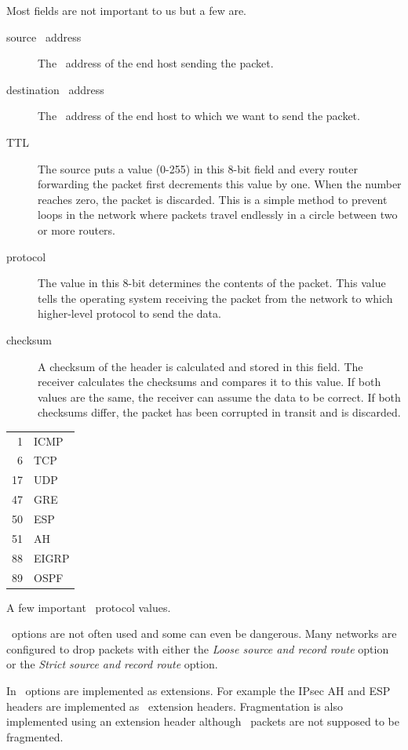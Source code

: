 Most fields are not important to us but a few are.
\begin{description}
\item[source \IP\ address]
   The \IP\ address of the end host sending the packet.
\item[destination \IP\ address]
   The \IP\ address of the end host to which we want to send the packet.
\item[\acf{TTL}]
   The source puts a value (0-255) in this 8-bit field and every router forwarding the packet first decrements this value by one.
   When the number reaches zero, the packet is discarded.
   This is a simple method to prevent loops in the network where packets travel endlessly in a circle between two or more routers.
\item[protocol]
   The value in this 8-bit determines the contents of the packet.
   This value tells the operating system receiving the packet from the network to which higher-level protocol to send the data.
\item[checksum]
   A checksum of the header is calculated and stored in this field.
   The receiver calculates the checksums and compares it to this value.
   If both values are the same, the receiver can assume the data to be correct.
   If both checksums differ, the packet has been corrupted in transit and is discarded.
\end{description}

\begin{margintable}
\begin{tabular}{rl}
 1 & \acs{ICMP}  \\
 6 & \acs{TCP}   \\
17 & \acs{UDP}   \\
47 & \acs{GRE}   \\
50 & \acs{ESP}   \\
51 & \acs{AH}    \\
88 & \acs{EIGRP} \\
89 & \acs{OSPF}  \\
\end{tabular}
\caption{A few important \IP\ protocol values.}
\end{margintable}

\IPfour\ options are not often used and some can even be dangerous.
Many networks are configured to drop packets with either the \emph{Loose source and record route} option or the \emph{Strict source and record route} option.

In \IPsix\ options are implemented as extensions.
For example the IPsec \acf{AH} and \acf{ESP} headers are implemented as \IPsix\ extension headers.
Fragmentation is also implemented using an extension header although \IPsix\ packets are not supposed to be fragmented.


